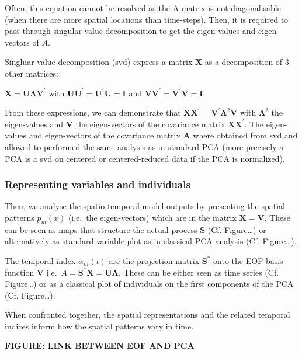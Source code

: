 \documentclass[
  man]{apa6}
\begin{document}
Often, this equation cannot be resolved as the A matrix is not diagonalisable (when there are more spatial locations than time-steps). Then, it is required to pass through singular value decomposition to get the eigen-values and eigen-vectors of \(A\).

Singluar value decomposition (svd) express a matrix \(\mathbf{X}\) as a decomposition of 3 other matrices:

\(\mathbf{X}=\mathbf{U} \mathbf{\Lambda} \mathbf{V}^{\prime}\) with \(\mathbf{U U}^{\prime}=\mathbf{U}^{\prime} \mathbf{U}=\mathbf{I}\) and \(\mathbf{V V}^{\prime}=\mathbf{V}^{\prime} \mathbf{V}=\mathbf{I}\).

From these expressions, we can demonstrate that \(\mathbf{XX}^{\prime} = \mathbf{V}^{\prime} \mathbf{\Lambda}^2 \mathbf{V}\) with \(\mathbf{\Lambda}^2\) the eigen-values and \(\mathbf{V}\) the eigen-vectors of the covariance matrix \(\mathbf{XX}^{\prime}\). The eigen-values and eigen-vectors of the covariance matrix \(\mathbf{A}\) where obtained from svd and allowed to performed the same analysis as in standard PCA (more precisely a PCA is a svd on centered or centered-reduced data if the PCA is normalized).

\hypertarget{representing-variables-and-individuals}{%
\subsubsection{Representing variables and individuals}\label{representing-variables-and-individuals}}

Then, we analyse the spatio-temporal model outputs by presenting the spatial patterns \(p_m(x)\) (i.e.~the eigen-vectors) which are in the matrix \(\mathbf{X}=\mathbf{V}\). These can be seen as maps that structure the actual process \(\mathbf{S}\) (Cf. Figure\ldots) or alternatively as standard variable plot as in classical PCA analysis (Cf. Figure\ldots).

The temporal index \(\alpha_m(t)\) are the projection matrix \(\mathbf{S}^*\) onto the EOF basis function \(\mathbf{V}\) i.e.~\(A=\mathbf{S}^*\mathbf{X}=\mathbf{U} \mathbf{\Lambda}\). These can be either seen as time series (Cf. Figure\ldots) or as a classical plot of individuals on the first components of the PCA (Cf. Figure\ldots).

When confronted together, the spatial representations and the related temporal indices inform how the spatial patterns vary in time.

\textbf{FIGURE: LINK BETWEEN EOF AND PCA}
\end{document}
